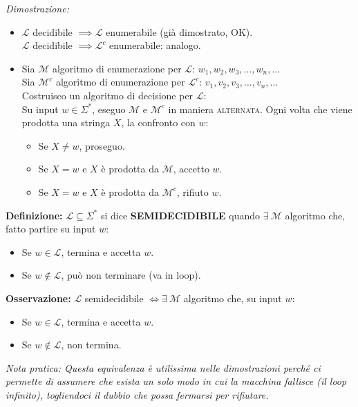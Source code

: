 \textit{Dimostrazione:}
\begin{itemize}
    \item[$\implies$)] $\mathcal{L}$ decidibile $\implies \mathcal{L}$ enumerabile (già dimostrato, OK). \\
    $\mathcal{L}$ decidibile $\implies \mathcal{L}^c$ enumerabile: analogo.
    
    \item[$\impliedby$)] Sia $\mathcal{M}$ algoritmo di enumerazione per $\mathcal{L}$: $w_1, w_2, w_3, \dots, w_n, \dots$ \\
    Sia $\mathcal{M}^c$ algoritmo di enumerazione per $\mathcal{L}^c$: $v_1, v_2, v_3, \dots, v_n, \dots$ \\
    Costruisco un algoritmo di decisione per $\mathcal{L}$: \\
    Su input $w \in \Sigma^*$, eseguo $\mathcal{M}$ e $\mathcal{M}^c$ in maniera \textsc{alternata}.
    Ogni volta che viene prodotta una stringa $X$, la confronto con $w$:
    \begin{itemize}
        \item Se $X \neq w$, proseguo.
        \item Se $X = w$ e $X$ è prodotta da $\mathcal{M}$, accetto $w$.
        \item Se $X = w$ e $X$ è prodotta da $\mathcal{M}^c$, rifiuto $w$.
    \end{itemize}
\end{itemize}

\vspace{0.4cm}
\textbf{Definizione:} $\mathcal{L} \subseteq \Sigma^*$ si dice \textbf{SEMIDECIDIBILE} quando $\exists\ \mathcal{M}$ algoritmo che, fatto partire su input $w$:
\begin{itemize}
    \item Se $w \in \mathcal{L}$, termina e accetta $w$.
    \item Se $w \notin \mathcal{L}$, può non terminare (va in loop).
\end{itemize}

\vspace{0.4cm}
\textbf{Osservazione:} $\mathcal{L}$ semidecidibile $\iff \exists\ \mathcal{M}$ algoritmo che, su input $w$:
\begin{itemize}
    \item Se $w \in \mathcal{L}$, termina e accetta $w$.
    \item Se $w \notin \mathcal{L}$, non termina.
\end{itemize}
\textit{Nota pratica: Questa equivalenza è utilissima nelle dimostrazioni perché ci permette di assumere che esista un solo modo in cui la macchina fallisce (il loop infinito), togliendoci il dubbio che possa fermarsi per rifiutare.}

